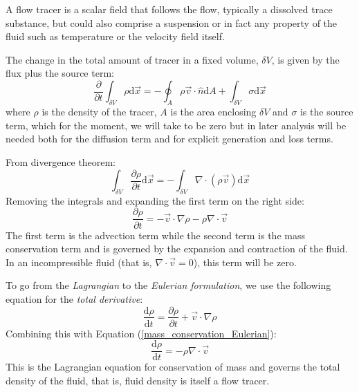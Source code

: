 \documentclass[11pt]{article}
\begin{document}
A flow tracer is a scalar field that follows the flow, typically a dissolved
trace substance, but could also comprise a suspension or in fact any property
of the fluid such as temperature or the velocity field itself.

The change in the total amount of tracer in a fixed volume, $\delta V$, is given
by the flux plus the source term:
\begin{equation}
	\frac{\partial}{\partial t}\int_{\delta V} \rho \mathrm d \vec x=-\oint_A \rho \vec v \cdot \hat n \mathrm d A
	+ \int_{\delta V} \sigma \mathrm d \vec x
	\label{volume_conservation_integral}
\end{equation}
where $\rho$ is the density of the tracer,
$A$ is the area enclosing $\delta V$ and $\sigma$ is the source term, which for the moment,
we will take to be zero but in later analysis will 
be needed both for the diffusion term and for explicit generation and loss terms.

From divergence theorem:
\begin{equation}
	\int_{\delta V} \frac{\partial \rho}{\partial t} \mathrm d \vec x=-\int_{\delta V} \nabla \cdot (\rho \vec v)\mathrm d \vec x 
\end{equation}
Removing the integrals and expanding the first term on the right side:
\begin{equation}
\frac{\partial \rho}{\partial t} =-\vec v \cdot \nabla \rho - \rho \nabla \cdot \vec v 
\label{mass_conservation_Eulerian}
\end{equation}
The first term is the advection term while the second term is the mass
conservation term and is governed by the 
expansion and contraction of the fluid.  In an incompressible fluid (that is,
$\nabla \cdot \vec v = 0$), this term will be zero.

To go from the {\it Lagrangian} to the {\it Eulerian formulation}, 
we use the following equation for the {\it total derivative}:
\begin{equation}
\frac{\mathrm d \rho}{\mathrm d t}
 = \frac{\partial \rho}{\partial t} + \vec v \cdot \nabla \rho
\end{equation}
Combining this with Equation (\ref{mass_conservation_Eulerian}):
\begin{equation}
\frac{\mathrm d \rho}{\mathrm d t} =  - \rho \nabla \cdot \vec v
\label{mass_conservation_Lagrangian}
\end{equation}
This is the Lagrangian equation for conservation of mass and governs the total density
of the fluid, that is, fluid density is itself a flow tracer.
\end{document}
